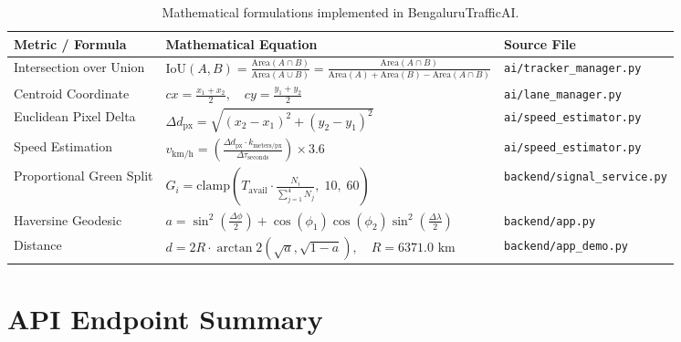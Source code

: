 \documentclass[11pt,a4paper,oneside]{report}
\begin{document}
\begin{table}[H]
\centering
\small
\begin{tabularx}{\textwidth}{l X l}
\toprule
\textbf{Metric / Formula} & \textbf{Mathematical Equation} & \textbf{Source File} \\
\midrule
Intersection over Union & $\text{IoU}(A, B) = \frac{\text{Area}(A \cap B)}{\text{Area}(A \cup B)} = \frac{\text{Area}(A \cap B)}{\text{Area}(A) + \text{Area}(B) - \text{Area}(A \cap B)}$ & \texttt{ai/tracker\_manager.py} \\[12pt]
Centroid Coordinate & $cx = \frac{x_1 + x_2}{2}, \quad cy = \frac{y_1 + y_2}{2}$ & \texttt{ai/lane\_manager.py} \\[10pt]
Euclidean Pixel Delta & $\Delta d_{\text{px}} = \sqrt{(x_2 - x_1)^2 + (y_2 - y_1)^2}$ & \texttt{ai/speed\_estimator.py} \\[10pt]
Speed Estimation & $v_{\text{km/h}} = \left(\frac{\Delta d_{\text{px}} \cdot k_{\text{meters/px}}}{\Delta \tau_{\text{seconds}}}\right) \times 3.6$ & \texttt{ai/speed\_estimator.py} \\[12pt]
Proportional Green Split & $G_i = \text{clamp}\left(T_{\text{avail}} \cdot \frac{N_i}{\sum_{j=1}^4 N_j}, \; 10, \; 60\right)$ & \texttt{backend/signal\_service.py} \\[12pt]
Haversine Geodesic & $a = \sin^2\left(\frac{\Delta \phi}{2}\right) + \cos(\phi_1)\cos(\phi_2)\sin^2\left(\frac{\Delta \lambda}{2}\right)$ & \texttt{backend/app.py} \\[6pt]
Distance & $d = 2 R \cdot \arctan2\left(\sqrt{a}, \sqrt{1 - a}\right), \quad R = 6371.0\text{ km}$ & \texttt{backend/app\_demo.py} \\
\bottomrule
\end{tabularx}
\caption{Mathematical formulations implemented in BengaluruTrafficAI.}
\label{tab:glossary_formulas}
\end{table}

\section{API Endpoint Summary}
\label{sec:glossary_endpoints}
\end{document}
